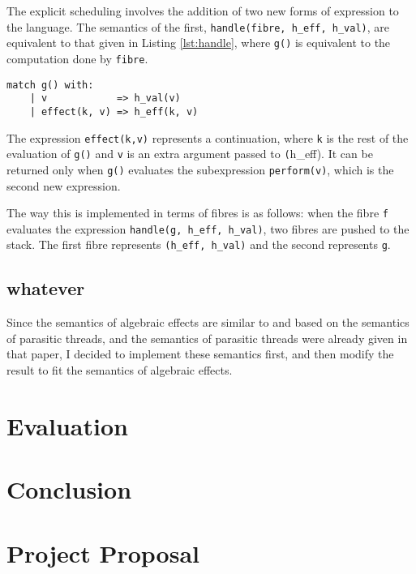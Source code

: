 \documentclass[12pt,a4paper,twoside,openright]{report}
\begin{document}
The explicit scheduling involves the addition of two new forms of expression to the language. The semantics of the first, \texttt{handle(fibre, h\_eff, h\_val)}, are equivalent to that given in Listing \ref{lst:handle}, where \texttt{g()} is equivalent to the computation done by \texttt{fibre}.

\begin{lstlisting}[caption=The semantics of \texttt{handle},label={lst:handle}]
  match g() with:
    | v            => h_val(v)
    | effect(k, v) => h_eff(k, v)
\end{lstlisting}

The expression \texttt{effect(k,v)} represents a continuation, where \texttt{k} is the rest of the evaluation of \texttt{g()} and \texttt{v} is an extra argument passed to \texttt(h\_eff). It can be returned only when \texttt{g()} evaluates the subexpression \texttt{perform(v)}, which is the second new expression.

The way this is implemented in terms of fibres is as follows: when the fibre \texttt{f} evaluates the expression \texttt{handle(g, h\_eff, h\_val)}, two fibres are pushed to the stack. The first fibre represents \texttt{(h\_eff, h\_val)} and the second represents \texttt{g}.

\section{whatever}

Since the semantics of algebraic effects are similar to and based on the semantics of parasitic threads, and the semantics of parasitic threads were already given in that paper, I decided to implement these semantics first, and then modify the result to fit the semantics of algebraic effects.



\chapter{Evaluation}

\chapter{Conclusion}


\appendix

\chapter{Project Proposal}
\end{document}
